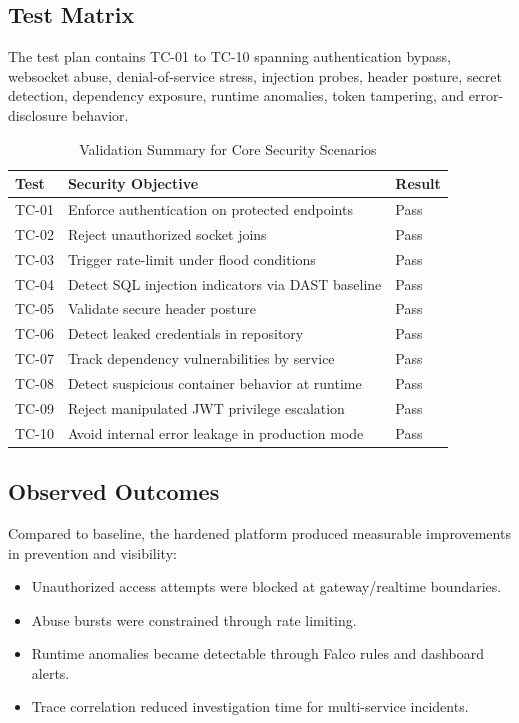 \documentclass[conference]{IEEEtran}
\begin{document}
\subsection{Test Matrix}
The test plan contains TC-01 to TC-10 spanning authentication bypass, websocket abuse, denial-of-service stress, injection probes, header posture, secret detection, dependency exposure, runtime anomalies, token tampering, and error-disclosure behavior.

\begin{table}[!t]
\caption{Validation Summary for Core Security Scenarios}
\centering
\footnotesize
\begin{tabularx}{\linewidth}{>{\raggedright\arraybackslash}p{0.88cm} Y >{\centering\arraybackslash}p{0.85cm}}
\toprule
Test & Security Objective & Result \\
\midrule
TC-01 & Enforce authentication on protected endpoints & Pass \\
TC-02 & Reject unauthorized socket joins & Pass \\
TC-03 & Trigger rate-limit under flood conditions & Pass \\
TC-04 & Detect SQL injection indicators via DAST baseline & Pass \\
TC-05 & Validate secure header posture & Pass \\
TC-06 & Detect leaked credentials in repository & Pass \\
TC-07 & Track dependency vulnerabilities by service & Pass \\
TC-08 & Detect suspicious container behavior at runtime & Pass \\
TC-09 & Reject manipulated JWT privilege escalation & Pass \\
TC-10 & Avoid internal error leakage in production mode & Pass \\
\bottomrule
\end{tabularx}
\label{tab:results}
\end{table}

\subsection{Observed Outcomes}
Compared to baseline, the hardened platform produced measurable improvements in prevention and visibility:
\begin{itemize}
\item Unauthorized access attempts were blocked at gateway/realtime boundaries.
\item Abuse bursts were constrained through rate limiting.
\item Runtime anomalies became detectable through Falco rules and dashboard alerts.
\item Trace correlation reduced investigation time for multi-service incidents.
\end{itemize}
\end{document}
